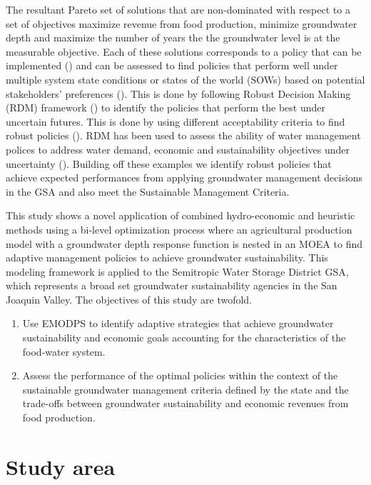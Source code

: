 \documentclass[11pt,a4paper]{article}
\begin{document}
The resultant Pareto set of solutions that are non-dominated with respect to a set of objectives maximize revenue from food production, minimize groundwater depth and maximize the number of years the the groundwater level is at the measurable objective. Each of these solutions corresponds to a policy that can be implemented (\cite{null_pareto_2021}) and can be assessed to find policies that perform well under multiple system state conditions or states of the world (SOWs) based on potential stakeholders' preferences (\cite{herman_climate_2020}). This is done by following Robust Decision Making (RDM) framework (\cite{groves_robust_2019,lempert_making_2013}) to identify the policies that perform the best under uncertain futures. This is done by using different acceptability criteria to find robust policies (\cite{mcphail_robustness_2018}). RDM has been used to assess the ability of water management polices to address water demand, economic and sustainability objectives under uncertainty (\cite{graveline_combining_2020,huskova_screening_2016,miro_adaptive_2021}). Building off these examples we identify robust policies that achieve expected performances from applying groundwater management decisions in the GSA and also meet the Sustainable Management Criteria. 

This study shows a novel application of combined hydro-economic and heuristic methods using a bi-level optimization process where an agricultural production model with a groundwater depth response function is nested in an MOEA to find adaptive management policies to achieve groundwater sustainability. This modeling framework is applied to the Semitropic Water Storage District GSA, which represents a broad set groundwater sustainability agencies in the San Joaquin Valley. The objectives of this study are twofold.  

\begin{enumerate}
    \item  Use EMODPS to identify adaptive strategies that achieve groundwater sustainability and economic goals accounting for the characteristics of the food-water system. 
    
    \item Assess the performance of the optimal policies within the context of the sustainable groundwater management criteria defined by the state and the trade-offs between groundwater sustainability and economic revenues from food production. 
\end{enumerate}

\section{Study area}
  
\end{document}
